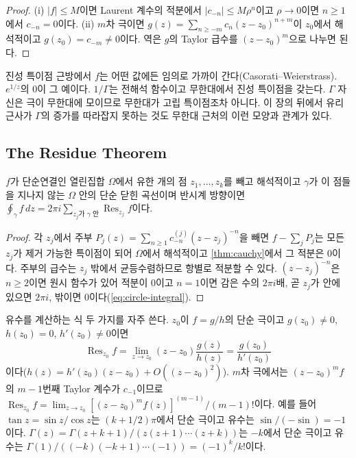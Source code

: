 \begin{proof}
(i) $|f|\le M$이면 Laurent 계수의 적분에서 $|c_{-n}|\le M\rho^n$이고 $\rho\to0$이면 $n\ge1$에서 $c_{-n}=0$이다. (ii) $m$차 극이면 $g(z)=\sum_{n\ge-m}c_n(z-z_0)^{n+m}$이 $z_0$에서 해석적이고 $g(z_0)=c_{-m}\ne0$이다. 역은 $g$의 Taylor 급수를 $(z-z_0)^m$으로 나누면 된다.
\end{proof}

진성 특이점 근방에서 $f$는 어떤 값에든 임의로 가까이 간다(Casorati--Weierstrass\cite{stein2003complex}). $e^{1/z}$의 $0$이 그 예이다. $1/\Gamma$는 전해석 함수이고 무한대에서 진성 특이점을 갖는다. $\Gamma$ 자신은 극이 무한대에 모이므로 무한대가 고립 특이점조차 아니다. 이 장의 뒤에서 유리 근사가 $\Gamma$의 증가를 따라잡지 못하는 것도 무한대 근처의 이런 모양과 관계가 있다.

\subsection{The Residue Theorem}

\begin{theorem}[유수 정리]
\label{thm:residue}
$f$가 단순연결인 열린집합 $\Omega$에서 유한 개의 점 $z_1,\dots,z_k$를 빼고 해석적이고 $\gamma$가 이 점들을 지나지 않는 $\Omega$ 안의 단순 닫힌 곡선이며 반시계 방향이면 $\oint_\gamma f\,dz=2\pi i\sum_{z_j\text{가 }\gamma\text{ 안}}\operatorname{Res}_{z_j}f$이다.
\end{theorem}

\begin{proof}
각 $z_j$에서 주부 $P_j(z)=\sum_{n\ge1}c^{(j)}_{-n}(z-z_j)^{-n}$을 빼면 $f-\sum_jP_j$는 모든 $z_j$가 제거 가능한 특이점이 되어 $\Omega$에서 해석적이고 \cref{thm:cauchy}에서 그 적분은 $0$이다. 주부의 급수는 $z_j$ 밖에서 균등수렴하므로 항별로 적분할 수 있다. $(z-z_j)^{-n}$은 $n\ge2$이면 원시 함수가 있어 적분이 $0$이고 $n=1$이면 감은 수의 $2\pi i$배, 곧 $z_j$가 안에 있으면 $2\pi i$, 밖이면 $0$이다(\cref{eq:circle-integral}).
\end{proof}

유수를 계산하는 식 두 가지를 자주 쓴다. $z_0$이 $f=g/h$의 단순 극이고 $g(z_0)\ne0$, $h(z_0)=0$, $h'(z_0)\ne0$이면
\begin{equation}
\label{eq:simple-residue}
\operatorname{Res}_{z_0}f=\lim_{z\to z_0}(z-z_0)\frac{g(z)}{h(z)}=\frac{g(z_0)}{h'(z_0)}
\end{equation}
이다($h(z)=h'(z_0)(z-z_0)+O((z-z_0)^2)$). $m$차 극에서는 $(z-z_0)^mf$의 $m-1$번째 Taylor 계수가 $c_{-1}$이므로 $\operatorname{Res}_{z_0}f=\lim_{z\to z_0}[(z-z_0)^mf(z)]^{(m-1)}/(m-1)!$이다. 예를 들어 $\tan z=\sin z/\cos z$는 $(k+1/2)\pi$에서 단순 극이고 유수는 $\sin/(-\sin)=-1$이다. $\Gamma(z)=\Gamma(z+k+1)/(z(z+1)\cdots(z+k))$는 $-k$에서 단순 극이고 유수는 $\Gamma(1)/((-k)(-k+1)\cdots(-1))=(-1)^k/k!$이다.

